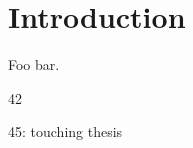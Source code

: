 \documentclass{book}
\begin{document}
\chapter{Introduction}
Foo bar.

42

45: touching thesis
\end{document}

